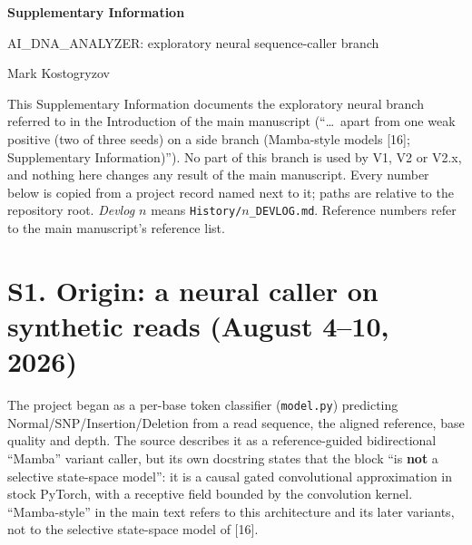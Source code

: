 \documentclass[11pt,a4paper]{article}
\newcommand{\src}[1]{{\small\texttt{#1}}}
\begin{document}
{\LARGE\bfseries\sffamily\color{accent} Supplementary Information}\par\vspace{0.4em}
{\large\sffamily AI\_DNA\_ANALYZER: exploratory neural sequence-caller branch}\par\vspace{0.3em}
{\sffamily Mark Kostogryzov}\par\vspace{1em}

This Supplementary Information documents the exploratory neural branch referred to in the
Introduction of the main manuscript (``\ldots\ apart from one weak positive (two of three seeds)
on a side branch (Mamba-style models [16]; Supplementary Information)''). No part of this branch
is used by V1, V2 or V2.x, and nothing here changes any result of the main manuscript. Every
number below is copied from a project record named next to it; paths are relative to the
repository root. \emph{Devlog $n$} means \src{History/$n$\_DEVLOG.md}. Reference numbers refer to
the main manuscript's reference list.

\section{S1. Origin: a neural caller on synthetic reads (August 4--10, 2026)}

The project began as a per-base token classifier (\src{model.py}) predicting
Normal/SNP/Insertion/Deletion from a read sequence, the aligned reference, base quality and
depth. The source describes it as a reference-guided bidirectional ``Mamba'' variant caller, but
its own docstring states that the block ``is \textbf{not} a selective state-space model'': it is
a causal gated convolutional approximation in stock PyTorch, with a receptive field bounded by
the convolution kernel. ``Mamba-style'' in the main text refers to this architecture and its
later variants, not to the selective state-space model of [16].
\end{document}

